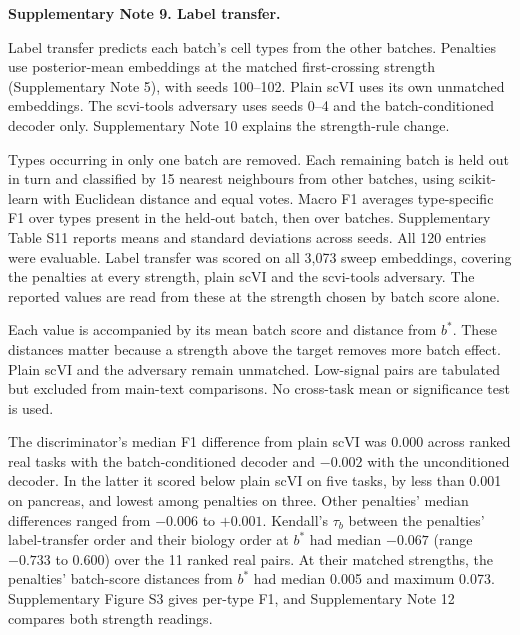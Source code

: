 \medskip\noindent\textbf{Supplementary Note 9. Label transfer.}\par\smallskip
\begingroup\small\setlength{\parskip}{3pt}
Label transfer predicts each batch's cell types from the other batches. Penalties use posterior-mean embeddings at the matched first-crossing strength (Supplementary Note 5), with seeds 100--102. Plain scVI uses its own unmatched embeddings. The scvi-tools adversary uses seeds 0--4 and the batch-conditioned decoder only. Supplementary Note 10 explains the strength-rule change.

Types occurring in only one batch are removed. Each remaining batch is held out in turn and classified by 15 nearest neighbours from other batches, using scikit-learn with Euclidean distance and equal votes. Macro F1 averages type-specific F1 over types present in the held-out batch, then over batches. Supplementary Table S11 reports means and standard deviations across seeds. All 120 entries were evaluable. Label transfer was scored on all 3,073 sweep embeddings, covering the penalties at every strength, plain scVI and the scvi-tools adversary. The reported values are read from these at the strength chosen by batch score alone.

Each value is accompanied by its mean batch score and distance from $b^*$. These distances matter because a strength above the target removes more batch effect. Plain scVI and the adversary remain unmatched. Low-signal pairs are tabulated but excluded from main-text comparisons. No cross-task mean or significance test is used.

The discriminator's median F1 difference from plain scVI was 0.000 across ranked real tasks with the batch-conditioned decoder and $-0.002$ with the unconditioned decoder. In the latter it scored below plain scVI on five tasks, by less than 0.001 on pancreas, and lowest among penalties on three. Other penalties' median differences ranged from $-0.006$ to $+0.001$. Kendall's $\tau_b$ between the penalties' label-transfer order and their biology order at $b^*$ had median $-0.067$ (range $-0.733$ to 0.600) over the 11 ranked real pairs. At their matched strengths, the penalties' batch-score distances from $b^*$ had median 0.005 and maximum 0.073. Supplementary Figure S3 gives per-type F1, and Supplementary Note 12 compares both strength readings.


\par\endgroup
